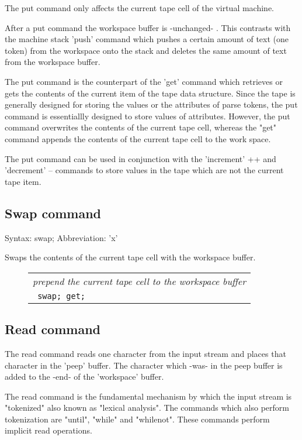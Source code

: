 \documentclass[a4paper,12pt]{article}
\begin{document}
 The put command only affects the current tape cell of the virtual
 machine.

 After a put command the workspace buffer is -unchanged- . This contrasts
 with the machine stack 'push' command which pushes a certain amount of text
 (one token) from the workspace onto the stack and deletes the same amount of
 text from the workspace buffer.

 The put command is the counterpart of the 'get' command which retrieves or
 gets the contents of the current item of the tape data structure. Since the
 tape is generally designed for storing the values or the attributes of parse
 tokens, the put command is essentiallly designed to store values of
 attributes. However, the put command overwrites the contents of the
 current tape cell, whereas the "get" command appends the contents of
 the current tape cell to the work space.

 The put command can be used in conjunction with the 'increment' ++ and
 'decrement' -- commands to store values in the tape which are not the current
 tape item.

\subsection{Swap command}
  
  Syntax: swap;
  Abbreviation: 'x'

  Swaps the contents of the current tape cell with the workspace buffer.
 \begin{figure}
 \begin{tabular}{ l }
 \emph{ prepend the current tape cell to the workspace buffer } \\ 
 \verb| swap; get; |
 \end{tabular} 
 \end{figure}

\subsection{Read command}
  
  The read command reads one character from the input stream and places that
  character in the 'peep' buffer. The character which -was- in the peep
  buffer is added to the -end- of the 'workspace' buffer.

  The read command is the fundamental mechanism by which the input stream is
  "tokenized" also known as "lexical analysis". The commands which also
  perform tokenization are "until", "while" and "whilenot". These commands
  perform implicit read operations.
\end{document}
